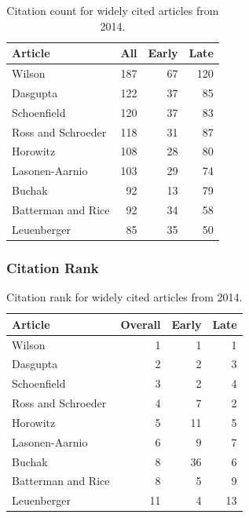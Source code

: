 \documentclass[
  10pt,
  letterpaper,
  DIV=11,
  numbers=noendperiod,
  twoside]{scrartcl}
\begin{document}
\begin{longtable}[]{@{}lrrr@{}}

\caption{\label{tbl-citation-count-2014}Citation count for widely cited
articles from 2014.}

\tabularnewline

\toprule\noalign{}
Article & All & Early & Late \\
\midrule\noalign{}
\endhead
\bottomrule\noalign{}
\endlastfoot
Wilson & 187 & 67 & 120 \\
Dasgupta & 122 & 37 & 85 \\
Schoenfield & 120 & 37 & 83 \\
Ross and Schroeder & 118 & 31 & 87 \\
Horowitz & 108 & 28 & 80 \\
Lasonen-Aarnio & 103 & 29 & 74 \\
Buchak & 92 & 13 & 79 \\
Batterman and Rice & 92 & 34 & 58 \\
Leuenberger & 85 & 35 & 50 \\

\end{longtable}

\subsubsection*{Citation Rank}\label{sec-rank-2014}

\begin{longtable}[]{@{}lrrr@{}}

\caption{\label{tbl-citation-rank-2014}Citation rank for widely cited
articles from 2014.}

\tabularnewline

\toprule\noalign{}
Article & Overall & Early & Late \\
\midrule\noalign{}
\endhead
\bottomrule\noalign{}
\endlastfoot
Wilson & 1 & 1 & 1 \\
Dasgupta & 2 & 2 & 3 \\
Schoenfield & 3 & 2 & 4 \\
Ross and Schroeder & 4 & 7 & 2 \\
Horowitz & 5 & 11 & 5 \\
Lasonen-Aarnio & 6 & 9 & 7 \\
Buchak & 8 & 36 & 6 \\
Batterman and Rice & 8 & 5 & 9 \\
Leuenberger & 11 & 4 & 13 \\

\end{longtable}
\end{document}
